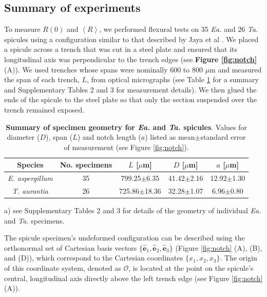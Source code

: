 \documentclass[12pt,onecolumn]{article}
\makeatletter
\newcommand{\ex}{\hat{\mathbf{e}}_1}
\newcommand{\ey}{\hat{\mathbf{e}}_2}
\newcommand{\ez}{\hat{\mathbf{e}}_3}
\newcommand{\TA}{\textit{Ta.\@}\xspace}
\newcommand{\EA}{\textit{Ea.\@}\xspace}
\newcommand{\ra}[1]{\renewcommand{\arraystretch}{#1}}
\makeatother
\begin{document}
\subsection*{Summary of experiments}
To measure $R(0)$ and $\left< R \right>$, we performed flexural tests on 35 \EA and 26 \TA spicules using a configuration similar to that described  by Jaya et al \cite{jaya2014crack,jaya2015can}. We placed a spicule across a trench that was cut in a steel plate and ensured that its longitudinal axis was perpendicular to the trench edges (see {\bf Figure \ref{fig:notch}} (A)). We used trenches whose spans were nominally 600 to 800 $\mu$m and measured the span of each trench, $L$, from optical micrographs (see Table \ref{tab:spiculegeom} for a summary and Supplementary Tables 2 and 3 for measurement details). We then glued the ends of the spicule to the steel plate so that only the section suspended over the trench remained exposed. 
%
\begin{table}
\centering
\ra{1.25}
\begin{threeparttable}[t]
\begin{tabular}{ccccc}
\toprule
Species & No. specimens & $L$ [$\mu$m] & $D$ [$\mu$m] & $a$ [$\mu$m]\\
\midrule
\textit{E. aspergillum} & 35 & 799.25$\pm$6.35 & 41.42$\pm$2.16 & 12.92$\pm$1.30\\
\textit{T. aurantia} & 26 & 725.86$\pm$18.36 & 32.28$\pm$1.07 & 6.96$\pm$0.80\\
\bottomrule
\end{tabular}
\begin{tablenotes}
\item[a)] {\footnotesize see Supplementary Tables 2 and 3 for details of the geometry of individual \EA and \TA specimens.}
\end{tablenotes}
\end{threeparttable}
\caption{\textbf{Summary of specimen geometry for \EA and \TA spicules}. Values for diameter ($D$), span ($L$) and notch length ($a$) listed as mean$\pm$standard error of measurement (see Figure \ref{fig:notch}).}
\label{tab:spiculegeom}
\end{table}

The spicule specimen's undeformed configuration can be described using the orthonormal set of Cartesian basis vectors $\{\ex,\ey,\ez\}$ (Figure \ref{fig:notch} (A), (B), and (D)), which correspond to the Cartesian coordinates $\{x_1,x_2,x_3\}$. The origin of this coordinate system, denoted as $\mathcal{O}$, is located at the point on the spicule's central, longitudinal axis directly above the left trench edge (see Figure \ref{fig:notch} (A)).
\end{document}
